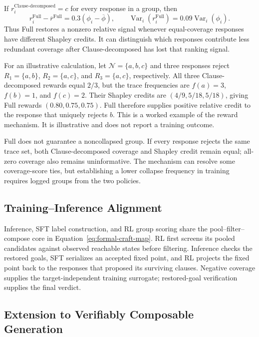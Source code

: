 If \(r_i^{\text{Clause-decomposed}}=c\) for every response in a group, then
\[
  r_i^{\mathrm{Full}}-\overline r^{\mathrm{Full}}
  =0.3(\phi_i-\overline\phi),\qquad
  \operatorname{Var}_i(r_i^{\mathrm{Full}})
  =0.09\operatorname{Var}_i(\phi_i).
\]
Thus Full restores a nonzero relative signal whenever equal-coverage
responses have different Shapley credits.  It can distinguish which
responses contribute less redundant coverage after Clause-decomposed has lost that
ranking signal.

For an illustrative calculation, let \(\mathcal N=\{a,b,c\}\) and three
responses reject \(R_1=\{a,b\}\), \(R_2=\{a,c\}\), and
\(R_3=\{a,c\}\), respectively.  All three Clause-decomposed rewards equal \(2/3\),
but the trace frequencies are \(f(a)=3\), \(f(b)=1\), and \(f(c)=2\).
Their Shapley credits are \((4/9,5/18,5/18)\), giving Full rewards
\((0.80,0.75,0.75)\).  Full therefore supplies positive relative credit to
the response that uniquely rejects \(b\).  This is a worked example of
the reward mechanism. It is illustrative and does not report a training outcome.

Full does not guarantee a noncollapsed group.  If every response rejects
the same trace set, both Clause-decomposed coverage and Shapley credit remain equal;
all-zero coverage also remains uninformative.  The mechanism can resolve
some coverage-score ties, but establishing a lower collapse frequency in
training requires logged groups from the two policies.

\subsection{Training--Inference Alignment}

Inference, SFT label construction, and RL group scoring share the
pool--filter--compose core in Equation~\eqref{eq:formal-craft-map}.  RL first
screens its pooled candidates against observed reachable states before
filtering.  Inference checks the restored goals, SFT serializes an accepted
fixed point, and RL projects the fixed point back to the responses that
proposed its surviving clauses.  Negative coverage supplies the
target-independent training surrogate; restored-goal verification supplies
the final verdict.

\subsection{Extension to Verifiably Composable Generation}

